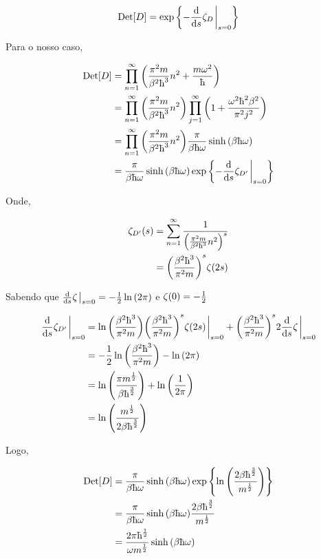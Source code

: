 \documentclass[twoside]{amsart}
\newcommand{\Det}[1]{\textup{Det} #1}
\numberwithin{equation}{section}
\begin{document}
\begin{align}
    \Det\qty[D]=\exp\qty{-\dv{}{s}\zeta_D\eval_{s=0}}
\end{align}

Para o nosso caso,

\begin{align}
    \Det\qty[D]&=\prod\limits_{n=1}^{\infty}\qty(\frac{\pi^2m}{\beta^2\hbar^3}n^2+\frac{m\omega^2}{\hbar})\\
    &=\prod\limits_{n=1}^{\infty}\qty(\frac{\pi^2m}{\beta^2\hbar^3}n^2)\prod\limits_{j=1}^{\infty}\qty(1+\frac{\omega^2\hbar^2\beta^2}{\pi^2j^2})\\
    &=\prod\limits_{n=1}^{\infty}\qty(\frac{\pi^2m}{\beta^2\hbar^3}n^2)\frac{\pi}{\beta\hbar\omega}\sinh\qty(\beta\hbar\omega) \\
    &=\frac{\pi}{\beta\hbar\omega}\sinh\qty(\beta\hbar\omega)\exp\qty{-\dv{}{s}\zeta_{D'}\eval_{s=0}}
\end{align}

Onde,

\begin{align}
    \zeta_{D'}\qty(s)&=\sum\limits_{n=1}^{\infty}\frac{1}{\qty(\frac{\pi^2m}{\beta^2\hbar^3}n^2)^s}\\
    &=\qty(\frac{\beta^2\hbar^3}{\pi^2m})^s\zeta\qty(2s)
\end{align}

Sabendo que $\dv{}{s}\zeta\eval_{s=0}=-\frac12\ln\qty(2\pi)$ e $\zeta\qty(0)=-\frac12$

\begin{align}
    \dv{}{s}\zeta_{D'}\eval_{s=0}&=\ln\qty(\frac{\beta^2\hbar^3}{\pi^2 m})\qty(\frac{\beta^2\hbar^3}{\pi^2m})^s\zeta\qty(2s)\eval_{s=0}+\qty(\frac{\beta^2\hbar^3}{\pi^2m})^s2\dv{}{s}\zeta\eval_{s=0}\\
    &=-\frac12\ln\qty(\frac{\beta^2\hbar^3}{\pi^2 m})-\ln\qty(2\pi)\\
    &=\ln\qty(\frac{\pi m^\frac12}{\beta\hbar^{\frac32}})+\ln\qty(\frac{1}{2\pi})\\
    &=\ln\qty(\frac{m^\frac12}{2\beta\hbar^\frac32})
\end{align}

Logo,

\begin{align}
    \Det\qty[D]&=\frac{\pi}{\beta\hbar\omega}\sinh\qty(\beta\hbar\omega)\exp\qty{\ln\qty(\frac{2\beta\hbar^\frac32}{m^\frac12})}\\
    &=\frac{\pi}{\beta\hbar\omega}\sinh\qty(\beta\hbar\omega)\frac{2\beta\hbar^\frac32}{m^\frac12}\\
    &=\frac{2\pi\hbar^\frac12}{\omega m^\frac12}\sinh\qty(\beta\hbar\omega)
\end{align}
\end{document}
